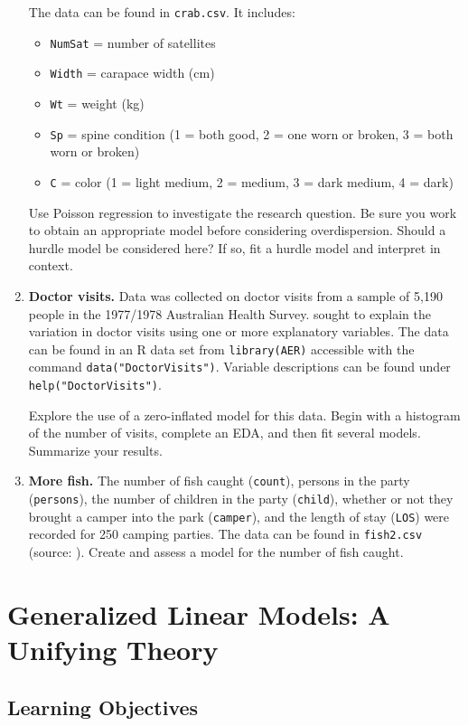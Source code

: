 \documentclass[
]{krantz}
\providecommand{\tightlist}{%
  \setlength{\itemsep}{0pt}\setlength{\parskip}{0pt}}
\begin{document}
\begin{enumerate}
  The data can be found in \texttt{crab.csv}. It includes:

  \begin{itemize}
  \tightlist
  \item
    \texttt{NumSat} = number of satellites
  \item
    \texttt{Width} = carapace width (cm)
  \item
    \texttt{Wt} = weight (kg)
  \item
    \texttt{Sp} = spine condition (1 = both good, 2 = one worn or broken, 3 = both worn or broken)
  \item
    \texttt{C} = color (1 = light medium, 2 = medium, 3 = dark medium, 4 = dark)
  \end{itemize}

  Use Poisson regression to investigate the research question. Be sure you work to obtain an appropriate model before considering overdispersion. Should a hurdle model be considered here? If so, fit a hurdle model and interpret in context.
\item
  \textbf{Doctor visits.} Data was collected on doctor visits from a sample of 5,190 people in the 1977/1978 Australian Health Survey. \citet{Cameron1986} sought to explain the variation in doctor visits using one or more explanatory variables. The data can be found in an R data set from \texttt{library(AER)} accessible with the command \texttt{data("DoctorVisits")}. Variable descriptions can be found under \texttt{help("DoctorVisits")}.

  Explore the use of a zero-inflated model for this data. Begin with a histogram of the number of visits, complete an EDA, and then fit several models. Summarize your results.
\item
  \textbf{More fish.} The number of fish caught (\texttt{count}), persons in the party (\texttt{persons}), the number of children in the party (\texttt{child}), whether or not they brought a camper into the park (\texttt{camper}), and the length of stay (\texttt{LOS}) were recorded for 250 camping parties. The data can be found in \texttt{fish2.csv} (source: \citet{idre2018}). Create and assess a model for the number of fish caught.
\end{enumerate}

\chapter{Generalized Linear Models: A Unifying Theory}\label{ch-glms}

\section{Learning Objectives}\label{learning-objectives-4}
\end{document}
